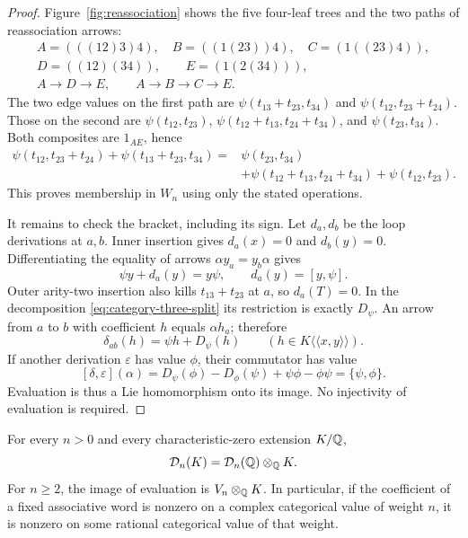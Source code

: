 \begin{proof}
Figure~\ref{fig:reassociation} shows the five four-leaf trees and
the two paths of reassociation arrows:
\[
\begin{gathered}
 A=(((12)3)4),\quad B=((1(23))4),\quad C=(1((23)4)),\\
 D=((12)(34)),\qquad E=(1(2(34))),\\
 A\longrightarrow D\longrightarrow E,
 \qquad A\longrightarrow B\longrightarrow C\longrightarrow E.
\end{gathered}
\]
The two edge values on the first path are
$\psi(t_{13}+t_{23},t_{34})$ and
$\psi(t_{12},t_{23}+t_{24})$.  Those on the second are
$\psi(t_{12},t_{23})$,
$\psi(t_{12}+t_{13},t_{24}+t_{34})$, and
$\psi(t_{23},t_{34})$.
Both composites are $1_{AE}$, hence
\begin{equation}\label{eq:category-pentagon}
\begin{split}
 \psi(t_{12},t_{23}+t_{24})+
 \psi(t_{13}+t_{23},t_{34})
 ={}&\psi(t_{23},t_{34})\\
 &+\psi(t_{12}+t_{13},t_{24}+t_{34})
 +\psi(t_{12},t_{23}).
\end{split}
\end{equation}
This proves membership in $W_n$ using only the stated operations.



It remains to check the bracket, including its sign.  Let $d_a,d_b$
be the loop derivations at $a,b$.  Inner insertion gives $d_a(x)=0$
and $d_b(y)=0$.  Differentiating the equality of arrows
$\alpha y_a=y_b\alpha$ gives
\[
 \psi y+d_a(y)=y\psi,
 \qquad d_a(y)=[y,\psi].
\]
Outer arity-two insertion also kills $t_{13}+t_{23}$ at $a$, so
$d_a(T)=0$.  In the decomposition
\eqref{eq:category-three-split} its restriction is exactly $D_\psi$.
An arrow from $a$ to $b$ with coefficient $h$ equals $\alpha h_a$;
therefore
\begin{equation}\label{eq:category-arrow-derivative}
 \delta_{ab}(h)=\psi h+D_\psi(h)
 \qquad(h\in K\langle\!\langle x,y\rangle\!\rangle).
\end{equation}
If another derivation $\varepsilon$ has value $\phi$, their commutator
has value
\[
 [\delta,\varepsilon](\alpha)
 =D_\psi(\phi)-D_\phi(\psi)+\psi\phi-\phi\psi
 =\{\psi,\phi\}.
\]
Evaluation is thus a Lie homomorphism onto its image.  No injectivity
of evaluation is required.
\end{proof}

\begin{lemma}\label{lem:rational-descent}
For every $n>0$ and every characteristic-zero extension $K/\mathbb Q$,
\[
 \mathcal D_n(K)=\mathcal D_n(\mathbb Q)\otimes_{\mathbb Q}K.
\]
For $n\geq2$, the image of evaluation is $V_n\otimes_{\mathbb Q}K$.
In particular, if the coefficient of a fixed associative word is
nonzero on a complex categorical value of weight $n$, it is nonzero
on some rational categorical value of that weight.
\end{lemma}

